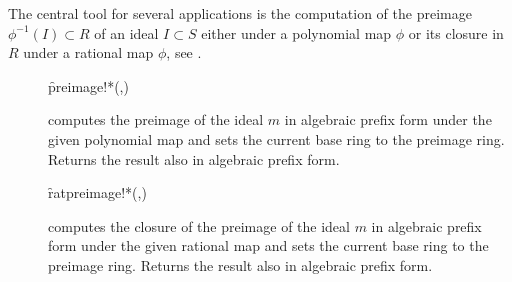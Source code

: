 The central tool for several applications is the computation of the
preimage $\phi^{-1}(I)\subset R$ of an ideal $I\subset S$ either
under a polynomial map $\phi$ or its closure in $R$ under a rational
map $\phi$, see \cite[7.69 and 7.71]{Becker:93}.
\begin{description}

\item[]
  \begin{syntax}
    \f{preimage!*}(,)
  \end{syntax}
  \hypertarget{procedure:PREIMAGE!*}{}
computes the preimage of the ideal $m$ in algebraic prefix form
under the given polynomial map and sets the current base ring to the
preimage ring. Returns the result also in algebraic prefix form.

\item[]
  \begin{syntax}
    \f{ratpreimage!*}(,)
  \end{syntax}
  \hypertarget{procedure:RATPREIMAGE!*}{}
computes the closure of the preimage of the ideal $m$ in
algebraic prefix form under the given rational map and sets the
current base ring to the preimage ring. Returns the result also in
algebraic prefix form.

\end{description}

